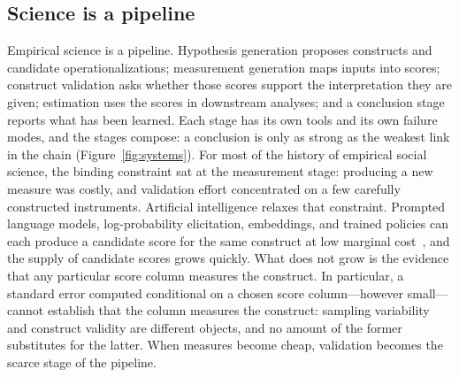 \documentclass[10pt,letterpaper]{article}
\begin{document}
\subsection{Science is a pipeline}
Empirical science is a pipeline.
Hypothesis generation proposes constructs and candidate operationalizations; measurement generation maps inputs into scores; construct validation asks whether those scores support the interpretation they are given; estimation uses the scores in downstream analyses; and a conclusion stage reports what has been learned.
Each stage has its own tools and its own failure modes, and the stages compose: a conclusion is only as strong as the weakest link in the chain (Figure~\ref{fig:systems}).
For most of the history of empirical social science, the binding constraint sat at the measurement stage: producing a new measure was costly, and validation effort concentrated on a few carefully constructed instruments.
Artificial intelligence relaxes that constraint.
Prompted language models, log-probability elicitation, embeddings, and trained policies can each produce a candidate score for the same construct at low marginal cost~\cite{horton2023,manning2024}, and the supply of candidate scores grows quickly.
What does not grow is the evidence that any particular score column measures the construct.
In particular, a standard error computed conditional on a chosen score column---however small---cannot establish that the column measures the construct: sampling variability and construct validity are different objects, and no amount of the former substitutes for the latter.
When measures become cheap, validation becomes the scarce stage of the pipeline.
\end{document}
